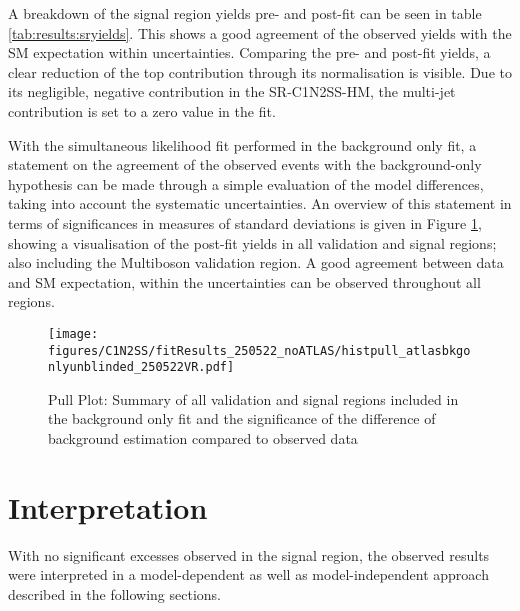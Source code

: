 A breakdown of the signal region yields pre- and post-fit can be seen in table \ref{tab:results:sryields}. This shows a good agreement of the observed yields with the \ac{SM} expectation within uncertainties.  Comparing the pre- and post-fit yields, a clear reduction of the top contribution through its normalisation is visible.  Due to its negligible,  negative contribution in the SR-C1N2SS-HM,  the multi-jet contribution is set to a zero value in the fit. 



With the simultaneous likelihood fit performed in the background only fit,  a statement on the agreement of the observed events with the background-only hypothesis can be made through a simple evaluation of the model differences, taking into account the systematic uncertainties.  
An overview of this statement in terms of significances in measures of standard deviations is given in Figure \ref{fig:analysis:fitSummary}, showing a visualisation of the post-fit yields in all validation and signal regions; also including the Multiboson validation region. A good agreement between data and \ac{SM} expectation, within the uncertainties can be observed throughout all regions. 

\begin{figure}[htp!]
\centering
\texttt{[image: figures/C1N2SS/fitResults\_250522\_noATLAS/histpull\_atlasbkgonlyunblinded\_250522VR.pdf]}
\caption{Pull Plot: Summary of all validation and signal regions included in the background only fit and the significance of the difference of background estimation compared to observed data  \label{fig:analysis:fitSummary}}
\end{figure}

\FloatBarrier
\section{Interpretation}
\label{sec:analysis:interpretation}
With no significant excesses observed in the signal region, the observed results were interpreted in a model-dependent as well as model-independent approach described in the following sections. 

